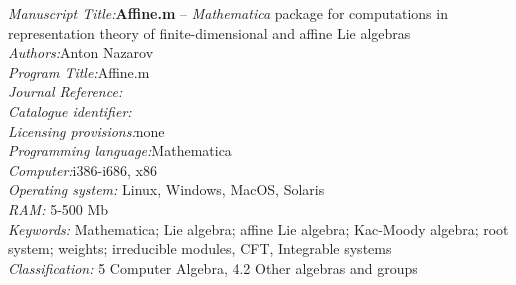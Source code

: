 \documentclass[preprint,12pt]{elsarticle}
\newcounter{bla}
\begin{document}
\begin{small}
\noindent
{\em Manuscript Title:}{\bf Affine.m} -- {\it Mathematica} package for computations in representation theory of finite-dimensional and affine Lie algebras                                       \\
{\em Authors:}Anton Nazarov                                                \\
{\em Program Title:}Affine.m                                          \\
{\em Journal Reference:}                                      \\
{\em Catalogue identifier:}                                   \\
{\em Licensing provisions:}none                                   \\
{\em Programming language:}Mathematica                                   \\
{\em Computer:}i386-i686, x86                                               \\
{\em Operating system:} Linux, Windows, MacOS, Solaris                                       \\
{\em RAM:} 5-500 Mb                                              \\
{\em Keywords:} Mathematica; Lie algebra; affine Lie algebra; Kac-Moody algebra; root system; weights; irreducible modules, CFT, Integrable systems\\
{\em Classification:} 5 Computer Algebra, 4.2 Other algebras and groups                                         \\

\end{small}
\end{document}
